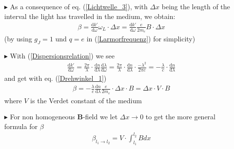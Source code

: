 \documentclass[11pt,a4paper]{beamer}
\begin{document}
\begin{frame}
\begin{itemize}
\item[$\blacktriangleright$] As a consequence of eq. (\ref{Lichtwelle_3}), with $\Delta x$ being the length of the interval the light has travelled in the medium, we obtain:
\begin{align}
\beta = \frac{\text{d} k'}{\text{d} \omega}\omega_L\cdot \Delta x = \frac{\text{d} k'}{\text{d} \omega}\frac{e}{2m_e}B\cdot \Delta x
\label{Drehwinkel_1}
\end{align}
(by using $g_J = 1$ und $ q = e $ in (\ref{Larmorfrequenz}) for simplicity)
\item[$\blacktriangleright$] With (\ref{Dispersionsrelation}) we see
\begin{align}
\frac{\text{d} k'}{\text{d} \omega} = \frac{2\pi}{\lambda}\cdot\frac{\text{d} n}{\text{d} \lambda}\frac{\text{d} \lambda}{\text{d} \omega} = \frac{2\pi}{\lambda}\cdot \frac{\text{d} n}{\text{d} \lambda} \cdot \frac{-\lambda^2}{2\pi c} = -\frac{\lambda}{c} \cdot \frac{\text{d} n}{\text{d} \lambda}
\end{align}
and get with eq. (\ref{Drehwinkel_1})
\begin{align}
\beta = -\frac{\lambda}{c} \frac{\text{d} n}{\text{d} \lambda}\frac{e}{2m_e}\cdot\Delta x\cdot B = \Delta x \cdot V \cdot B
\label{Drehwinkel_2}
\end{align}
where $V$ is the Verdet constant of the medium
\end{itemize}
\end{frame}
\begin{frame}
\begin{itemize}
\item[$\blacktriangleright$] For non homogeneous \textbf{B}-field we let $\Delta x \rightarrow 0$ to get the more general formula for $\beta$
\begin{align}
\beta_{l_1\rightarrow l_2} = V \cdot \int_{l_1}^{l_2} B dx
\end{align}
\end{itemize}
\end{frame}
\end{document}
